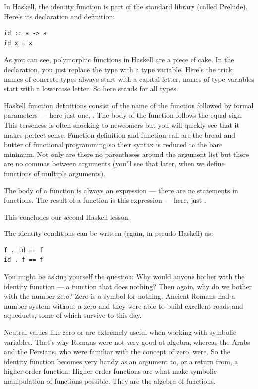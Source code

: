 In Haskell, the identity function is part of the standard library
(called Prelude). Here's its declaration and definition:

\begin{verbatim}
id :: a -> a
id x = x
\end{verbatim}
As you can see, polymorphic functions in Haskell are a piece of cake. In
the declaration, you just replace the type with a type variable. Here's
the trick: names of concrete types always start with a capital letter,
names of type variables start with a lowercase letter. So here
 stands for all types.

Haskell function definitions consist of the name of the function
followed by formal parameters --- here just one, . The body of
the function follows the equal sign. This terseness is often shocking to
newcomers but you will quickly see that it makes perfect sense. Function
definition and function call are the bread and butter of functional
programming so their syntax is reduced to the bare minimum. Not only are
there no parentheses around the argument list but there are no commas
between arguments (you'll see that later, when we define functions of
multiple arguments).

The body of a function is always an expression --- there are no
statements in functions. The result of a function is this expression ---
here, just .

This concludes our second Haskell lesson.

The identity conditions can be written (again, in pseudo-Haskell) as:

\begin{verbatim}
f . id == f
id . f == f
\end{verbatim}
You might be asking yourself the question: Why would anyone bother with
the identity function --- a function that does nothing? Then again, why
do we bother with the number zero? Zero is a symbol for nothing. Ancient
Romans had a number system without a zero and they were able to build
excellent roads and aqueducts, some of which survive to this day.

Neutral values like zero or  are extremely useful when
working with symbolic variables. That's why Romans were not very good at
algebra, whereas the Arabs and the Persians, who were familiar with the
concept of zero, were. So the identity function becomes very handy as an
argument to, or a return from, a higher-order function. Higher order
functions are what make symbolic manipulation of functions possible.
They are the algebra of functions.

